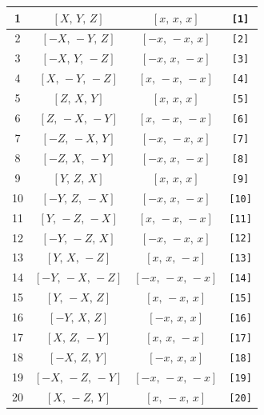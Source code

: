 \documentclass[fleqn,8pt]{jsarticle}
\begin{document}
\begin{longtable}{cccc}
1 & $\left[ X,\, Y,\, Z \right]$ & $\left[ x,\, x,\, x \right]$ & {\tt [1]} \\ \hline
2 & $\left[ - X,\, - Y,\, Z \right]$ & $\left[ - x,\, - x,\, x \right]$ & {\tt [2]} \\ \hline
3 & $\left[ - X,\, Y,\, - Z \right]$ & $\left[ - x,\, x,\, - x \right]$ & {\tt [3]} \\ \hline
4 & $\left[ X,\, - Y,\, - Z \right]$ & $\left[ x,\, - x,\, - x \right]$ & {\tt [4]} \\ \hline
5 & $\left[ Z,\, X,\, Y \right]$ & $\left[ x,\, x,\, x \right]$ & {\tt [5]} \\ \hline
6 & $\left[ Z,\, - X,\, - Y \right]$ & $\left[ x,\, - x,\, - x \right]$ & {\tt [6]} \\ \hline
7 & $\left[ - Z,\, - X,\, Y \right]$ & $\left[ - x,\, - x,\, x \right]$ & {\tt [7]} \\ \hline
8 & $\left[ - Z,\, X,\, - Y \right]$ & $\left[ - x,\, x,\, - x \right]$ & {\tt [8]} \\ \hline
9 & $\left[ Y,\, Z,\, X \right]$ & $\left[ x,\, x,\, x \right]$ & {\tt [9]} \\ \hline
10 & $\left[ - Y,\, Z,\, - X \right]$ & $\left[ - x,\, x,\, - x \right]$ & {\tt [10]} \\ \hline
11 & $\left[ Y,\, - Z,\, - X \right]$ & $\left[ x,\, - x,\, - x \right]$ & {\tt [11]} \\ \hline
12 & $\left[ - Y,\, - Z,\, X \right]$ & $\left[ - x,\, - x,\, x \right]$ & {\tt [12]} \\ \hline
13 & $\left[ Y,\, X,\, - Z \right]$ & $\left[ x,\, x,\, - x \right]$ & {\tt [13]} \\ \hline
14 & $\left[ - Y,\, - X,\, - Z \right]$ & $\left[ - x,\, - x,\, - x \right]$ & {\tt [14]} \\ \hline
15 & $\left[ Y,\, - X,\, Z \right]$ & $\left[ x,\, - x,\, x \right]$ & {\tt [15]} \\ \hline
16 & $\left[ - Y,\, X,\, Z \right]$ & $\left[ - x,\, x,\, x \right]$ & {\tt [16]} \\ \hline
17 & $\left[ X,\, Z,\, - Y \right]$ & $\left[ x,\, x,\, - x \right]$ & {\tt [17]} \\ \hline
18 & $\left[ - X,\, Z,\, Y \right]$ & $\left[ - x,\, x,\, x \right]$ & {\tt [18]} \\ \hline
19 & $\left[ - X,\, - Z,\, - Y \right]$ & $\left[ - x,\, - x,\, - x \right]$ & {\tt [19]} \\ \hline
20 & $\left[ X,\, - Z,\, Y \right]$ & $\left[ x,\, - x,\, x \right]$ & {\tt [20]} \\ \hline

\end{longtable}
\end{document}
